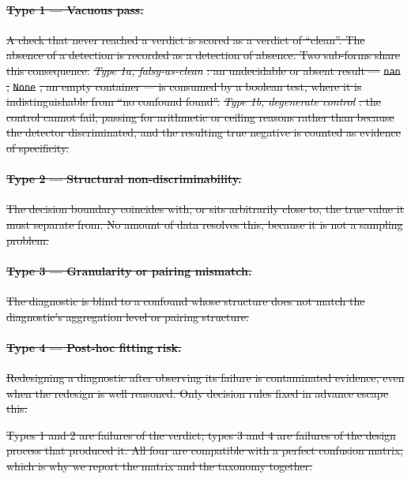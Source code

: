 \documentclass[pmlr,twocolumn,10pt]{jmlr}
\DeclareRobustCommand{\DIFdel}[1]{{\color{red}\sout{#1}}} %
\providecommand{\DIFdelbegin}{} %
\begin{document}
\DIFdelbegin \paragraph{\DIFdel{Type 1 --- Vacuous pass.}} %
\addtocounter{paragraph}{-1}%
\DIFdel{A check that never reached a verdict is
scored as a verdict of ``clean''. The absence of a detection is recorded as a
detection of absence. Two sub-forms share this consequence.
}\emph{\DIFdel{Type 1a, falsy-as-clean}}%
\DIFdel{: an undecidable or absent result --- }\texttt{\DIFdel{nan}}%
\DIFdel{,
}\texttt{\DIFdel{None}}%
\DIFdel{, an empty container --- is consumed by a boolean test, where it is
indistinguishable from ``no confound found''.
}\emph{\DIFdel{Type 1b, degenerate control}}%
\DIFdel{: the control cannot fail, passing for
arithmetic or ceiling reasons rather than because the detector discriminated,
and the resulting true negative is counted as evidence of specificity.
}%

\paragraph{\DIFdel{Type 2 --- Structural non-discriminability.}} %
\addtocounter{paragraph}{-1}%
\DIFdel{The decision boundary
coincides with, or sits arbitrarily close to, the true value it must separate
from. No amount of data resolves this, because it is not a sampling problem.
}%

\paragraph{\DIFdel{Type 3 --- Granularity or pairing mismatch.}} %
\addtocounter{paragraph}{-1}%
\DIFdel{The diagnostic is blind
to a confound whose structure does not match the diagnostic's aggregation level
or pairing structure.
}%

\paragraph{\DIFdel{Type 4 --- Post-hoc fitting risk.}} %
\addtocounter{paragraph}{-1}%
\DIFdel{Redesigning a diagnostic after
observing its failure is contaminated evidence, even when the redesign is well
reasoned. Only decision rules fixed in advance escape this.
}%

\DIFdel{Types 1 and 2 are failures of the verdict; types 3 and 4 are failures of the
design process that produced it. All four are compatible with a perfect
confusion matrix, which is why we report the matrix and the taxonomy together.
}%
\end{document}

